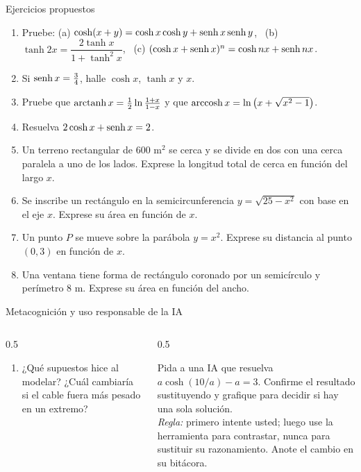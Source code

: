 \documentclass[10pt,aspectratio=169]{beamer}
\begin{document}
\begin{frame}{Ejercicios propuestos}
  \small
  \begin{ejercicio}
    \begin{enumerate}
      \item Pruebe: (a) $\cosh(x+y)=\cosh x\cosh y+\operatorname{senh} x\operatorname{senh} y$, \ (b) $\tanh2x=\dfrac{2\tanh x}{1+\tanh^2x}$, \ (c) $(\cosh x+\operatorname{senh} x)^n=\cosh nx+\operatorname{senh} nx$.
      \item Si $\operatorname{senh} x=\frac34$, halle $\cosh x$, $\tanh x$ y $x$.
      \item Pruebe que $\operatorname{arctanh} x=\frac12\ln\frac{1+x}{1-x}$ y que $\operatorname{arccosh} x=\ln\big(x+\sqrt{x^2-1}\big)$.
      \item Resuelva $2\cosh x+\operatorname{senh} x=2$.
      \item Un terreno rectangular de $600$ m$^2$ se cerca y se divide en dos con una cerca paralela a uno de los lados. Exprese la longitud total de cerca en
        función del largo $x$.
      \item Se inscribe un rectángulo en la semicircunferencia $y=\sqrt{25-x^2}$ con base en el eje $x$. Exprese su área en función de $x$.
      \item Un punto $P$ se mueve sobre la parábola $y=x^2$. Exprese su distancia al punto $(0,3)$ en función de $x$.
      \item Una ventana tiene forma de rectángulo coronado por un semicírculo y perímetro $8$ m. Exprese su área en función del ancho.
    \end{enumerate}
  \end{ejercicio}
\end{frame}

\begin{frame}{Metacognición y uso responsable de la IA}
  \small
  \begin{columns}[t]
    \begin{column}{0.5\textwidth}
      \begin{metacog}
        \begin{enumerate}
          \metacomun
          \item ¿Qué supuestos hice al modelar? ¿Cuál cambiaría si el cable fuera más pesado en un extremo?
        \end{enumerate}
      \end{metacog}
    \end{column}
    \begin{column}{0.5\textwidth}
      \begin{iabox}
        Pida a una IA que resuelva $a\cosh(10/a)-a=3$. Confirme el resultado sustituyendo y grafique para decidir si hay una sola solución.\\[2pt]
        \textit{Regla:} primero intente usted; luego use la herramienta para contrastar, nunca para sustituir su razonamiento. Anote el cambio en su bitácora.
      \end{iabox}
    \end{column}
  \end{columns}
\end{frame}
\end{document}
